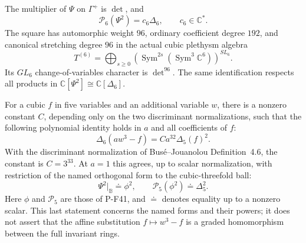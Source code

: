\begin{corollary}
\label{cor:fourfold-theta-discriminant}
The multiplier of $\Psi$ on $\Gamma^+$ is $\det$, and
\[
          \mathcal P_6(\Psi^2)=c_6\Delta_6,
                    \qquad c_6\in\mathbb C^*.
 \tag{P-F55b}
\]
The square has automorphic weight $96$, ordinary coefficient
degree $192$, and canonical stretching degree $96$ in the
actual cubic plethysm algebra
\[
       T^{(6)}=\bigoplus_{s\ge0}
        \left(\operatorname{Sym}^{2s}
                    (\operatorname{Sym}^3\mathbb C^6)\right)^{SL_6}.
 \tag{P-F55c}
\]
Its $GL_6$ change-of-variables character is $\det^{96}$.
The same identification respects all products in
$\mathbb C[\Psi^2]\cong\mathbb C[\Delta_6]$.

For a cubic $f$ in five variables and an additional variable $w$,
there is a nonzero constant $C$, depending only on the two
discriminant normalizations, such that the following polynomial
identity holds in $a$ and all coefficients of $f$:
\[
           \Delta_6(a w^3-f)=C a^{32}\Delta_5(f)^2.
 \tag{P-F55d}
\]
With the discriminant normalization of Bus\'e--Jouanolou
Definition~4.6, the constant is $C=3^{33}$.
At $a=1$ this agrees, up to scalar normalization, with restriction
of the named orthogonal form to the cubic-threefold ball:
\[
        \Psi^2|_{\mathbb B}\doteq\phi^2,
        \qquad \mathcal P_5(\phi^2)\doteq\Delta_5^2.
 \tag{P-F55e}
\]
Here $\phi$ and $\mathcal P_5$ are those of P-F41, and
$\doteq$ denotes equality up to a nonzero scalar. This last
statement concerns the named forms and their powers; it does not
assert that the affine substitution $f\mapsto w^3-f$ is a graded
homomorphism between the full invariant rings.
\end{corollary}

